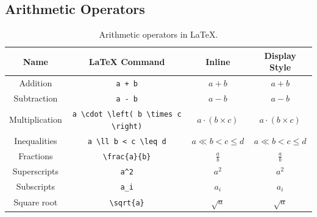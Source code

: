\documentclass[11pt, twoside]{article}
\begin{document}
\subsection{Arithmetic Operators}
\begin{table}[H]
    \centering
    \begingroup
    \renewcommand{\arraystretch}{1.2}
    \begin{tabular}{c c c c}
        \toprule
        \textbf{Name}  & \textbf{\LaTeX{} Command}                     & \textbf{Inline}                       & \textbf{Display Style}                              \\
        \midrule
        Addition       & \lstinline|a + b|                             & \(a + b\)                             & \(\displaystyle a + b\)                             \\
        Subtraction    & \lstinline|a - b|                             & \(a - b\)                             & \(\displaystyle a - b\)                             \\ %
        Multiplication & \lstinline|a \cdot \left( b \times c \right)| & \(a \cdot \left( b \times c \right)\) & \(\displaystyle a \cdot \left( b \times c \right)\) \\ %
        Inequalities   & \lstinline|a \ll b < c \leq d|                & \(a \ll b < c \leq d\)                & \(\displaystyle a \ll b < c \leq d\)                \\
        Fractions      & \lstinline|\frac{a}{b}|                       & \(\frac{a}{b}\)                       & \(\displaystyle \frac{a}{b}\)                       \\
        Superscripts   & \lstinline|a^2|                               & \(a^2\)                               & \(\displaystyle a^2\)                               \\
        Subscripts     & \lstinline|a_i|                               & \(a_i\)                               & \(\displaystyle a_i\)                               \\
        Square root    & \lstinline|\sqrt{a}|                          & \(\sqrt{a}\)                          & \(\displaystyle \sqrt{a}\)                          \\
        \bottomrule
    \end{tabular}
    \endgroup
    \caption{Arithmetic operators in \LaTeX{}.} %
\end{table}
\end{document}
